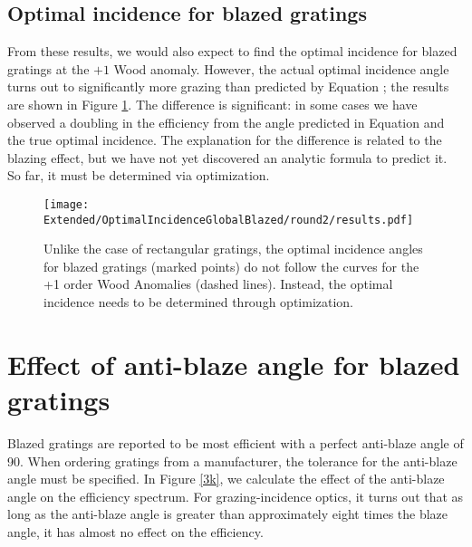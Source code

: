 \subsection{Optimal incidence for blazed gratings}
From these results, we would also expect to find the optimal incidence for blazed gratings at the $+1$ Wood anomaly.  However, the actual optimal incidence angle turns out to significantly more grazing than predicted by Equation ; the results are shown in Figure \ref{blazedIncidenceOpt}.  The difference is significant: in some cases we have observed a doubling in the efficiency from the angle predicted in Equation  and the true optimal incidence.  The explanation for the difference is related to the blazing effect, but we have not yet discovered an analytic formula to predict it. So far, it must be determined via optimization.

\begin{figure}[htbp] %
   \centering
   \texttt{[image: Extended/OptimalIncidenceGlobalBlazed/round2/results.pdf]} 
   \caption[Unlike rectangular gratings, the optimal incidence angle for blazed gratings (marked points) does not follow the curve for the +1 order Wood Anomaly (dashed lines).]{Unlike the case of rectangular gratings, the optimal incidence angles for blazed gratings (marked points) do not follow the curves for the +1 order Wood Anomalies (dashed lines).  Instead, the optimal incidence needs to be determined through optimization.}
   \label{blazedIncidenceOpt}
\end{figure}



\section{Effect of anti-blaze angle for blazed gratings}
Blazed gratings are reported to be most efficient with a perfect anti-blaze angle of 90\dg \cite{Pal05}.  When ordering gratings from a manufacturer, the tolerance for the anti-blaze angle must be specified.  In Figure \ref{3k}, we calculate the effect of the anti-blaze angle on the efficiency spectrum.  For grazing-incidence optics, it turns out that as long as the anti-blaze angle is greater than approximately eight times the blaze angle, it has almost no effect on the efficiency.

